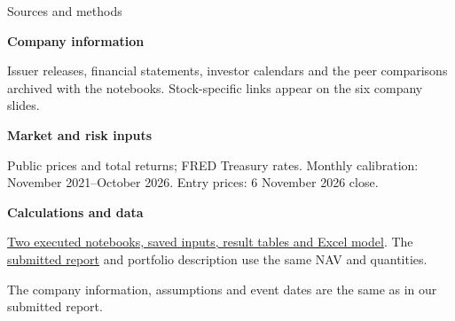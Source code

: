 \documentclass[aspectratio=169,11pt,t]{beamer}
\newcommand{\source}[1]{\par\vfill{\fontsize{6.3}{8}\selectfont\color{muted}#1\par}}
\newcommand{\point}[2]{\textbf{#1}\par\vspace{.04cm}#2\par\vspace{.12cm}}
\begin{document}
\begin{frame}{Sources and methods}

\point{Company information}{Issuer releases, financial statements, investor calendars and the peer comparisons archived with the notebooks. Stock-specific links appear on the six company slides.}
\point{Market and risk inputs}{Public prices and total returns; FRED Treasury rates. Monthly calibration: November 2021--October 2026. Entry prices: 6 November 2026 close.}
\point{Calculations and data}{\href{https://github.com/kybeka/meridian-capital/tree/main/research/round-2}{Two executed notebooks, saved inputs, result tables and Excel model}. The \href{https://kybeka.github.io/meridian-capital/materials/round-2-report.pdf}{submitted report} and portfolio description use the same NAV and quantities.}
\source{The company information, assumptions and event dates are the same as in our submitted report.}

\end{frame}
\end{document}
